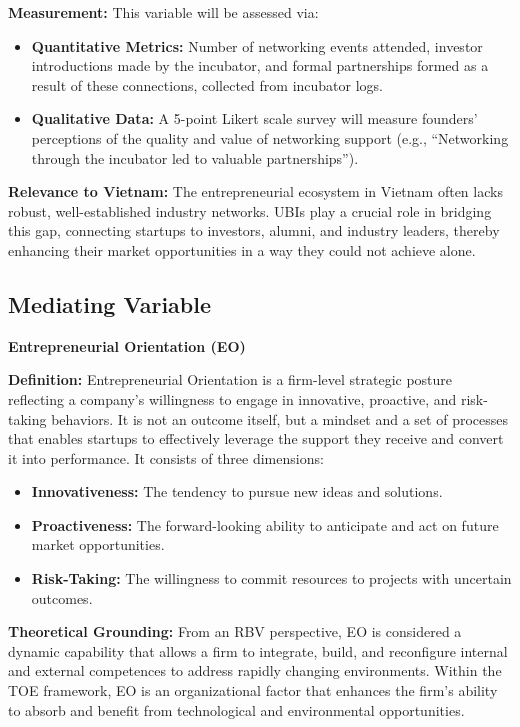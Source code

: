 \documentclass[../Main.tex]{subfiles}
\begin{document}
    \textbf{Measurement:} This variable will be assessed via:
    \begin{itemize}
        \item \textbf{Quantitative Metrics:} Number of networking events attended, investor introductions made by the incubator, and formal partnerships formed as a result of these connections, collected from incubator logs.
        \item \textbf{Qualitative Data:} A 5-point Likert scale survey will measure founders' perceptions of the quality and value of networking support (e.g., ``Networking through the incubator led to valuable partnerships'').
    \end{itemize}
    
    \textbf{Relevance to Vietnam:} The entrepreneurial ecosystem in Vietnam often lacks robust, well-established industry networks. UBIs play a crucial role in bridging this gap, connecting startups to investors, alumni, and industry leaders, thereby enhancing their market opportunities in a way they could not achieve alone.

    \subsection{Mediating Variable}
    
    \textbf{Entrepreneurial Orientation (EO)}
    
    \textbf{Definition:} Entrepreneurial Orientation is a firm-level strategic posture reflecting a company's willingness to engage in innovative, proactive, and risk-taking behaviors. It is not an outcome itself, but a mindset and a set of processes that enables startups to effectively leverage the support they receive and convert it into performance. It consists of three dimensions:
    \begin{itemize}
        \item \textbf{Innovativeness:} The tendency to pursue new ideas and solutions.
        \item \textbf{Proactiveness:} The forward-looking ability to anticipate and act on future market opportunities.
        \item \textbf{Risk-Taking:} The willingness to commit resources to projects with uncertain outcomes.
    \end{itemize}
    
    \textbf{Theoretical Grounding:} From an RBV perspective, EO is considered a dynamic capability that allows a firm to integrate, build, and reconfigure internal and external competences to address rapidly changing environments. Within the TOE framework, EO is an organizational factor that enhances the firm's ability to absorb and benefit from technological and environmental opportunities.
    
\end{document}
